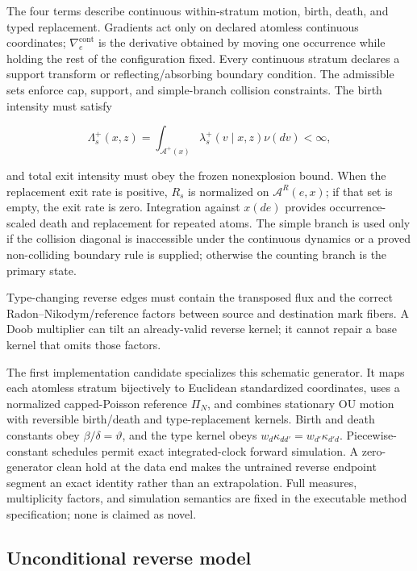 \documentclass[11pt]{article}
\newcommand{\supportingfile}[2]{%
  \emph{#1} (\nolinkurl{#2})%
}
\def\supportingfile#1#2{#1}%
\begin{document}
The four terms describe continuous within-stratum motion, birth, death, and typed replacement. Gradients act only on declared atomless continuous coordinates; \(\nabla_e^{\mathrm{cont}}\) is the derivative obtained by moving one occurrence while holding the rest of the configuration fixed. Every continuous stratum declares a support transform or reflecting/\allowbreak{}absorbing boundary condition. The admissible sets enforce cap, support, and simple-branch collision constraints. The birth intensity must satisfy

\[
\Lambda_s^+(x,z)
=\int_{\mathcal A^+(x)}\lambda_s^+(v\mid x,z)\nu(dv)<\infty,
\]

and total exit intensity must obey the frozen nonexplosion bound. When the replacement exit rate is positive, \(R_s\) is normalized on \(\mathcal A^R(e,x)\); if that set is empty, the exit rate is zero. Integration against \(x(de)\) provides occurrence-scaled death and replacement for repeated atoms. The simple branch is used only if the collision diagonal is inaccessible under the continuous dynamics or a proved non-colliding boundary rule is supplied; otherwise the counting branch is the primary state.

Type-changing reverse edges must contain the transposed flux and the correct Radon--Nikodym/\allowbreak{}reference factors between source and destination mark fibers. A Doob multiplier can tilt an already-valid reverse kernel; it cannot repair a base kernel that omits those factors.

The first implementation candidate specializes this schematic generator. It maps each atomless stratum bijectively to Euclidean standardized coordinates, uses a normalized capped-Poisson reference \(\Pi_N\), and combines stationary OU motion with reversible birth/\allowbreak{}death and type-replacement kernels. Birth and death constants obey \(\beta/\delta=\vartheta\), and the type kernel obeys \(w_d\kappa_{dd'}=w_{d'}\kappa_{d'd}\). Piecewise-constant schedules permit exact integrated-clock forward simulation. A zero-generator clean hold at the data end makes the untrained reverse endpoint segment an exact identity rather than an extrapolation. Full measures, multiplicity factors, and simulation semantics are fixed in the \supportingfile{executable method specification}{executable_method_spec.md}; none is claimed as novel.

\subsection{Unconditional reverse model}
\label{sec:unconditional-reverse-model}
\end{document}
